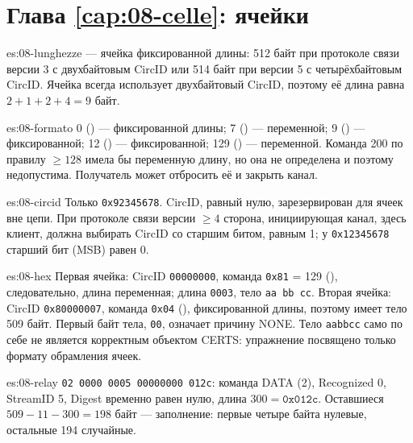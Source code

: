\section*{Глава \ref{cap:08-celle}: ячейки}

\begin{soluzione}{es:08-lunghezze}
 — ячейка фиксированной длины: 512 байт при протоколе связи версии 3 с двухбайтовым CircID или 514 байт при версии 5 с четырёхбайтовым CircID. Ячейка  всегда использует двухбайтовый CircID, поэтому её длина равна $2 + 1 + 2 + 4 = 9$ байт.
\end{soluzione}

\begin{soluzione}{es:08-formato}
0 () — фиксированной длины; 7 () — переменной; 9 () — фиксированной; 12 () — фиксированной; 129 () — переменной. Команда 200 по правилу $\ge 128$ имела бы переменную длину, но она не определена и поэтому недопустима. Получатель может отбросить её и закрыть канал.
\end{soluzione}

\begin{soluzione}{es:08-circid}
Только \texttt{0x92345678}. CircID, равный нулю, зарезервирован для ячеек вне цепи. При протоколе связи версии $\ge 4$ сторона, инициирующая канал, здесь клиент, должна выбирать CircID со старшим битом, равным 1; у \texttt{0x12345678} старший бит (MSB) равен 0.
\end{soluzione}

\begin{soluzione}{es:08-hex}
Первая ячейка: CircID \texttt{00000000}, команда \texttt{0x81} = 129 (), следовательно, длина переменная; длина \texttt{0003}, тело \texttt{aa bb cc}. Вторая ячейка: CircID \texttt{0x80000007}, команда \texttt{0x04} (), фиксированной длины, поэтому имеет тело 509 байт. Первый байт тела, \texttt{00}, означает причину NONE. Тело \texttt{aabbcc} само по себе не является корректным объектом CERTS: упражнение посвящено только формату обрамления ячеек.
\end{soluzione}

\begin{soluzione}{es:08-relay}
\texttt{02 0000 0005 00000000 012c}: команда DATA (2), Recognized 0, StreamID 5, Digest временно равен нулю, длина $300 = \texttt{0x012c}$. Оставшиеся $509 - 11 - 300 = 198$ байт — заполнение: первые четыре байта нулевые, остальные 194 случайные.
\end{soluzione}

